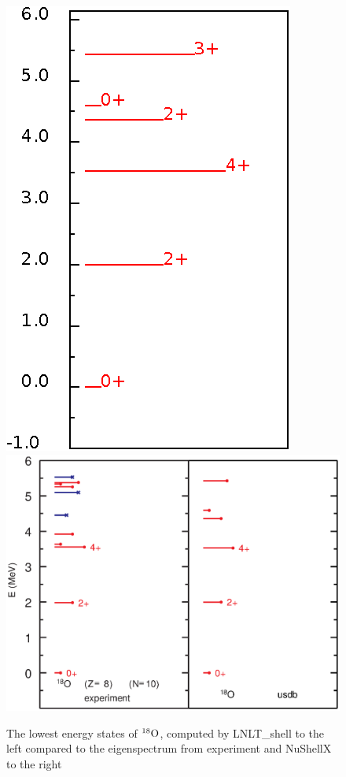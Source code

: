 \begin{figure}[ht!]
\includegraphics{ox18.eps}
\includegraphics[scale=0.56,trim=0cm 2.3cm 0cm 0cm]{o_18b.eps}
\caption{The lowest energy states of $^{18}\rm{O}$, computed by LNLT\_shell to the left compared to the eigenspectrum from experiment and NuShellX to the right}
\label{fig:ox18eig}
\end{figure}

